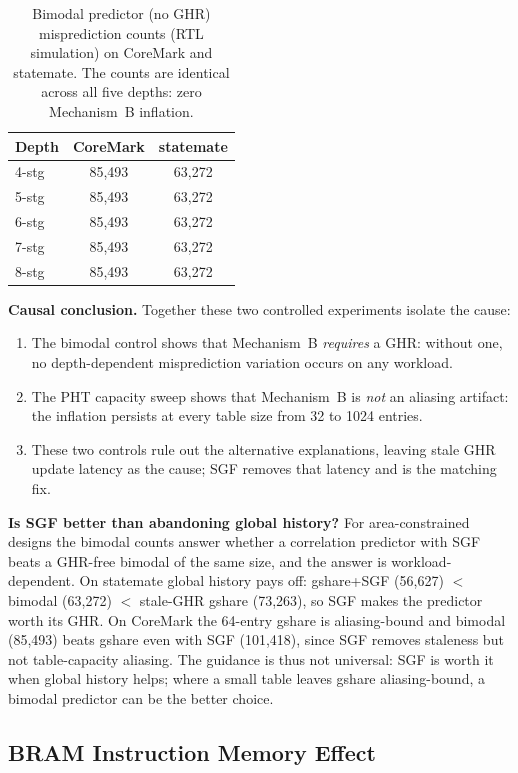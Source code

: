 \documentclass[acmsmall,nonacm,screen]{acmart}
\begin{document}
\begin{table}[t]
\centering
\caption{Bimodal predictor (no GHR) misprediction counts (RTL simulation) on CoreMark and statemate. The counts are identical across all five depths: zero Mechanism~B inflation.}
\label{tab:bimodal}
\small
\begin{tabular}{@{}lcc@{}}
\toprule
\textbf{Depth} & \textbf{CoreMark} & \textbf{statemate} \\
\midrule
4-stg & 85{,}493 & 63{,}272 \\
5-stg & 85{,}493 & 63{,}272 \\
6-stg & 85{,}493 & 63{,}272 \\
7-stg & 85{,}493 & 63{,}272 \\
8-stg & 85{,}493 & 63{,}272 \\
\bottomrule
\end{tabular}
\end{table}

\textbf{Causal conclusion.}
Together these two controlled experiments isolate the cause:
\begin{enumerate}
\item The bimodal control shows that Mechanism~B \emph{requires} a GHR: without one, no depth-dependent misprediction variation occurs on any workload.
\item The PHT capacity sweep shows that Mechanism~B is \emph{not} an aliasing artifact: the inflation persists at every table size from 32 to 1024 entries.
\item These two controls rule out the alternative explanations, leaving stale GHR update latency as the cause; SGF removes that latency and is the matching fix.
\end{enumerate}

\textbf{Is SGF better than abandoning global history?}
For area-constrained designs the bimodal counts answer whether a correlation predictor with SGF beats a GHR-free bimodal of the same size, and the answer is workload-dependent.
On statemate global history pays off: gshare+SGF (56{,}627) $<$ bimodal (63{,}272) $<$ stale-GHR gshare (73{,}263), so SGF makes the predictor worth its GHR.
On CoreMark the 64-entry gshare is aliasing-bound and bimodal (85{,}493) beats gshare even with SGF (101{,}418), since SGF removes staleness but not table-capacity aliasing.
The guidance is thus not universal: SGF is worth it when global history helps; where a small table leaves gshare aliasing-bound, a bimodal predictor can be the better choice.

\subsection{BRAM Instruction Memory Effect}
\label{sec:bram}
\end{document}
